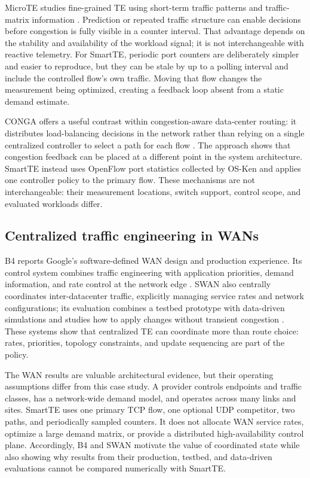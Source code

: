 MicroTE studies fine-grained TE using short-term traffic patterns and traffic-matrix information \cite{microte}. Prediction or repeated traffic structure can enable decisions before congestion is fully visible in a counter interval. That advantage depends on the stability and availability of the workload signal; it is not interchangeable with reactive telemetry. For SmartTE, periodic port counters are deliberately simpler and easier to reproduce, but they can be stale by up to a polling interval and include the controlled flow's own traffic. Moving that flow changes the measurement being optimized, creating a feedback loop absent from a static demand estimate.

CONGA offers a useful contrast within congestion-aware data-center routing: it distributes load-balancing decisions in the network rather than relying on a single centralized controller to select a path for each flow \cite{conga}. The approach shows that congestion feedback can be placed at a different point in the system architecture. SmartTE instead uses OpenFlow port statistics collected by OS-Ken and applies one controller policy to the primary flow. These mechanisms are not interchangeable: their measurement locations, switch support, control scope, and evaluated workloads differ.

\subsection{Centralized traffic engineering in WANs}
B4 reports Google's software-defined WAN design and production experience. Its control system combines traffic engineering with application priorities, demand information, and rate control at the network edge \cite{b4}. SWAN also centrally coordinates inter-datacenter traffic, explicitly managing service rates and network configurations; its evaluation combines a testbed prototype with data-driven simulations and studies how to apply changes without transient congestion \cite{swan}. These systems show that centralized TE can coordinate more than route choice: rates, priorities, topology constraints, and update sequencing are part of the policy.

The WAN results are valuable architectural evidence, but their operating assumptions differ from this case study. A provider controls endpoints and traffic classes, has a network-wide demand model, and operates across many links and sites. SmartTE uses one primary TCP flow, one optional UDP competitor, two paths, and periodically sampled counters. It does not allocate WAN service rates, optimize a large demand matrix, or provide a distributed high-availability control plane. Accordingly, B4 and SWAN motivate the value of coordinated state while also showing why results from their production, testbed, and data-driven evaluations cannot be compared numerically with SmartTE.

